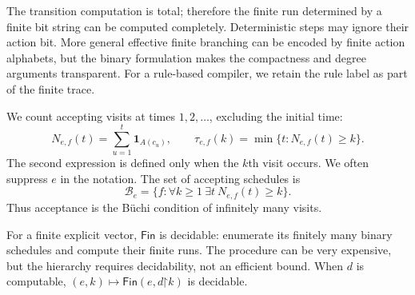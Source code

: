 \documentclass[11pt,letterpaper]{article}
\theoremstyle{definition}
\newtheorem{definition}[theorem]{Definition}
\theoremstyle{remark}
\newcommand{\N}{\mathbb N}
\newcommand{\B}{\{0,1\}}
\newcommand{\Fin}{\mathsf{Fin}}
\newcommand{\pref}{\mathord{\upharpoonright}}
\newcommand{\ind}{\mathbf 1}
\newcommand{\cK}{\mathcal K}
\newcommand{\cB}{\mathcal B}
\newcommand{\1}{\mathbf 1}
\begin{document}
The transition computation is total; therefore the finite run determined
by a finite bit string can be computed completely. Deterministic steps may
ignore their action bit. More general effective finite branching can be
encoded by finite action alphabets, but the binary formulation makes the
compactness and degree arguments transparent. For a rule-based compiler,
we retain the rule label as part of the finite trace.

We count accepting visits at times $1,2,\ldots$, excluding the initial time:
\begin{equation}\label{lbh:eq:count}
 N_{e,f}(t)=\sum_{u=1}^{t}\ind_{A(c_u)},\qquad
 \tau_{e,f}(k)=\min\{t:N_{e,f}(t)\ge k\}.
\end{equation}
The second expression is defined only when the $k$th visit occurs. We often
suppress $e$ in the notation. The set of accepting schedules is
\begin{equation}\label{lbh:eq:buchi-class}
 \cB_e=\{f:\forall k\ge1\ \exists t\ N_{e,f}(t)\ge k\}.
\end{equation}
Thus acceptance is the B\"uchi condition of infinitely many visits.


For a finite explicit vector, $\Fin$ is decidable: enumerate its finitely
many binary schedules and compute their finite runs. The procedure can be
very expensive, but the hierarchy requires decidability, not an efficient
bound. When $d$ is computable, $(e,k)\mapsto\Fin(e,d\pref k)$ is decidable.
\end{document}
